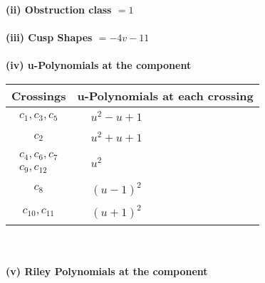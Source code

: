 \documentclass[1p]{elsarticle_modified}
\theoremstyle{definition}
\begin{document}
\flushleft \textbf{(ii) Obstruction class $= 1$}\\~\\
\flushleft \textbf{(iii) Cusp Shapes $= -4 v-11$}\\~\\
\newpage\renewcommand{\arraystretch}{1}
\flushleft \textbf{(iv) u-Polynomials at the component}\newline \\
\begin{tabular}{m{50pt}|m{274pt}}
Crossings & \hspace{64pt}u-Polynomials at each crossing \\
\hline $$\begin{aligned}c_{1},c_{3},c_{5}\end{aligned}$$&$\begin{aligned}
&u^2- u+1
\end{aligned}$\\
\hline $$\begin{aligned}c_{2}\end{aligned}$$&$\begin{aligned}
&u^2+u+1
\end{aligned}$\\
\hline $$\begin{aligned}c_{4},c_{6},c_{7}\\c_{9},c_{12}\end{aligned}$$&$\begin{aligned}
&u^2
\end{aligned}$\\
\hline $$\begin{aligned}c_{8}\end{aligned}$$&$\begin{aligned}
&(u-1)^2
\end{aligned}$\\
\hline $$\begin{aligned}c_{10},c_{11}\end{aligned}$$&$\begin{aligned}
&(u+1)^2
\end{aligned}$\\
\hline
\end{tabular}\\~\\
\newpage\renewcommand{\arraystretch}{1}
\flushleft \textbf{(v) Riley Polynomials at the component}\newline \\
\end{document}
